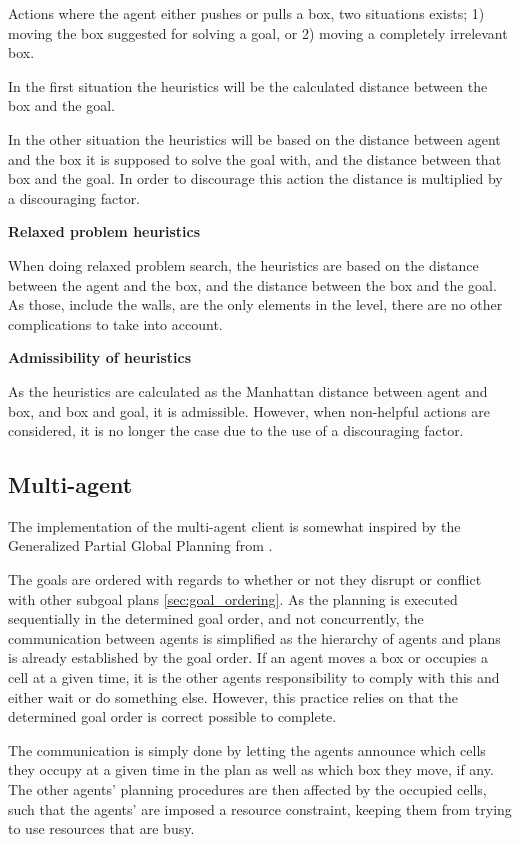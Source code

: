 \documentclass[Main]{subfiles}
\begin{document}
Actions where the agent either pushes or pulls a box, two situations exists; 1) moving the box suggested for solving a goal, or 2) moving a completely irrelevant box. 

In the first situation the heuristics will be the calculated distance between the box and the goal.

In the other situation the heuristics will be based on the distance between agent and the box it is supposed to solve the goal with, and the distance between that box and the goal. In order to discourage this action the distance is multiplied by a discouraging factor.


\textbf{Relaxed problem heuristics}

When doing relaxed problem search, the heuristics are based on the distance between the agent and the box, and the distance between the box and the goal. As those, include the walls, are the only elements in the level, there are no other complications to take into account. 



\textbf{Admissibility of heuristics}

As the heuristics are calculated as the Manhattan distance between agent and box, and box and goal, it is admissible. However, when non-helpful actions are considered, it is no longer the case due to the use of a discouraging factor. 

\subsection{Multi-agent} 

The implementation of the multi-agent client is somewhat inspired by the Generalized Partial Global Planning from \cite{Decker2000}. 

The goals are ordered with regards to whether or not they disrupt or conflict with other subgoal plans \autoref{sec:goal_ordering}. As the planning is executed sequentially in the determined goal order, and not concurrently, the communication between agents is simplified as the hierarchy of agents and plans is already established by the goal order. 
If an agent moves a box or occupies a cell at a given time, it is the other agents responsibility to comply with this and either wait or do something else. However, this practice relies on that the determined goal order is correct possible to complete. 

The communication is simply done by letting the agents announce which cells they occupy at a given time in the plan as well as which box they move, if any. The other agents' planning procedures are then affected by the occupied cells, such that the agents' are imposed a resource constraint, keeping them from trying to use resources that are busy. 
\end{document}

